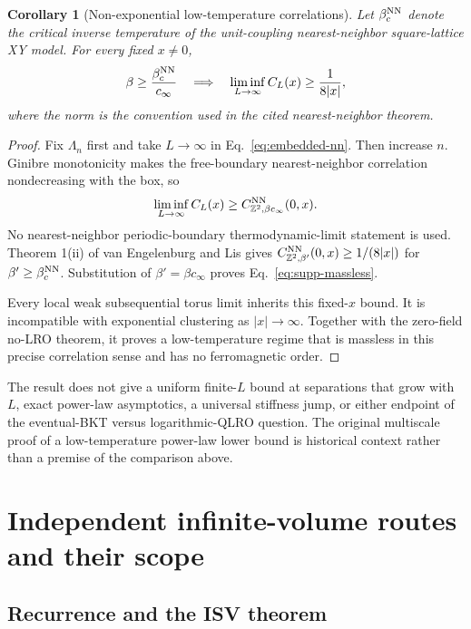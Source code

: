 \documentclass[aps,prb,preprint,notitlepage,groupedaddress,amsmath,amssymb,
               superscriptaddress,nofootinbib,floatfix]{revtex4-2}
\theoremstyle{definition}
\theoremstyle{plain}
\newtheorem{corollary}{Corollary}
\begin{document}
\begin{corollary}[Non-exponential low-temperature correlations]
\label{cor:supp-massless}
Let $\beta_c^{\rm NN}$ denote the critical inverse temperature of the
unit-coupling nearest-neighbor square-lattice XY model.  For every fixed
$x\ne0$,
\begin{equation}
 \beta\ge\frac{\beta_c^{\rm NN}}{c_\infty}
 \quad\Longrightarrow\quad
 \liminf_{L\to\infty}C_L(x)
 \ge\frac{1}{8|x|},
\label{eq:supp-massless}
\end{equation}
where the norm is the convention used in the cited nearest-neighbor
theorem.
\end{corollary}

\begin{proof}
Fix $\Lambda_n$ first and take $L\to\infty$ in
Eq.~\eqref{eq:embedded-nn}.  Then increase $n$.  Ginibre monotonicity makes
the free-boundary nearest-neighbor correlation nondecreasing with the box,
so
\begin{equation}
 \liminf_{L\to\infty}C_L(x)
 \ge
 C_{\mathbb Z^2,\beta c_\infty}^{\rm NN}(0,x).
\end{equation}
No nearest-neighbor periodic-boundary thermodynamic-limit statement is
used.  Theorem 1(ii) of van Engelenburg and Lis
\cite{VanEngelenburgLis2023} gives
$C_{\mathbb Z^2,\beta'}^{\rm NN}(0,x)\ge1/(8|x|)$ for
$\beta'\ge\beta_c^{\rm NN}$.  Substitution of
$\beta'=\beta c_\infty$ proves Eq.~\eqref{eq:supp-massless}.

Every local weak subsequential torus limit inherits this fixed-$x$ bound.
It is incompatible with exponential clustering as $|x|\to\infty$.
Together with the zero-field no-LRO theorem, it proves a low-temperature
regime that is massless in this precise correlation sense and has no
ferromagnetic order.
\end{proof}

The result does not give a uniform finite-$L$ bound at separations that
grow with $L$, exact power-law asymptotics, a universal stiffness jump, or
either endpoint of the eventual-BKT versus logarithmic-QLRO question.
The original multiscale proof of a low-temperature power-law lower bound
\cite{FrohlichSpencer1981} is historical context rather than a premise of
the comparison above.

\section{Independent infinite-volume routes and their scope}

\subsection{Recurrence and the ISV theorem}
\end{document}
